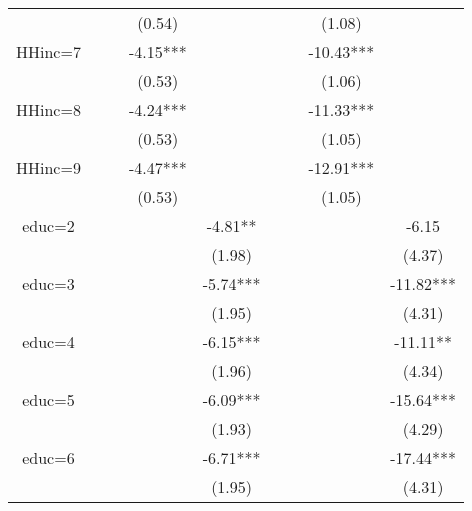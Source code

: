 \documentclass[12pt,notitlepage,onecolumn,aps,pra]{article}
\begin{document}
\begin{table}[ht]
\begin{adjustbox}{width={0.9\textwidth},totalheight={\textheight}}
\begin{threeparttable}
\begin{tabular}{ccccccccc}
             &          &           &     (0.54) &             &           &            &      (1.08) &              \\
HHinc=7      &          &           &   -4.15*** &             &           &            &   -10.43*** &              \\
             &          &           &     (0.53) &             &           &            &      (1.06) &              \\
HHinc=8      &          &           &   -4.24*** &             &           &            &   -11.33*** &              \\
             &          &           &     (0.53) &             &           &            &      (1.05) &              \\
HHinc=9      &          &           &   -4.47*** &             &           &            &   -12.91*** &              \\
             &          &           &     (0.53) &             &           &            &      (1.05) &              \\
educ=2       &          &           &            &     -4.81** &           &            &             &        -6.15 \\
             &          &           &            &      (1.98) &           &            &             &       (4.37) \\
educ=3       &          &           &            &    -5.74*** &           &            &             &    -11.82*** \\
             &          &           &            &      (1.95) &           &            &             &       (4.31) \\
educ=4       &          &           &            &    -6.15*** &           &            &             &     -11.11** \\
             &          &           &            &      (1.96) &           &            &             &       (4.34) \\
educ=5       &          &           &            &    -6.09*** &           &            &             &    -15.64*** \\
             &          &           &            &      (1.93) &           &            &             &       (4.29) \\
educ=6       &          &           &            &    -6.71*** &           &            &             &    -17.44*** \\
             &          &           &            &      (1.95) &           &            &             &       (4.31) \\

\end{tabular}
\end{threeparttable}
\end{adjustbox}
\end{table}
\end{document}
